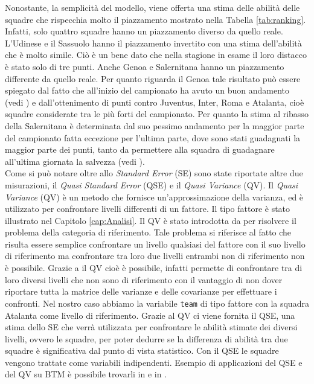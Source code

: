 Nonostante, la semplicità del modello, viene offerta una stima delle abilità delle squadre che rispecchia molto il piazzamento mostrato nella Tabella \ref{tab:ranking}. Infatti, solo quattro squadre hanno un piazzamento diverso da quello reale. L'Udinese e il Sassuolo hanno il piazzamento invertito con una stima dell'abilità che è molto simile. Ciò è un bene dato che nella stagione in esame il loro distacco è stato solo di tre punti. Anche Genoa e Salernitana hanno un piazzamento differente da quello reale. Per quanto riguarda il Genoa tale risultato può essere spiegato dal fatto che all'inizio del campionato ha avuto un buon andamento (vedi \textit{\cite{site:storyGenoa}}) e dall'ottenimento di punti contro Juventus, Inter, Roma e Atalanta, cioè squadre considerate tra le più forti del campionato. Per quanto la stima al ribasso della Salernitana è determinata dal suo pessimo andamento per la maggior parte del campionato fatta eccezione per l'ultima parte, dove sono stati guadagnati la maggior parte dei punti, tanto da permettere alla squadra di guadagnare all'ultima giornata la salvezza (vedi \textit{\cite{site:storySal}}). \\
Come si può notare oltre allo \emph{Standard Error} (SE) sono state riportate altre due misurazioni, il \emph{Quasi Standard Error} (QSE) \autocite{firth2004quasi} e il \emph{Quasi Variance} (QV)\autocite{firth2004quasi}. Il \emph{Quasi Variance} (QV)\autocite{firth2004quasi} è un metodo che fornisce un'approssimazione della varianza, ed è utilizzato per confrontare livelli differenti di un fattore. Il tipo fattore è stato illustrato nel Capitolo \ref{cap:Analisi}. Il QV è stato introdotta da \textcite{firth2004quasi} per risolvere il problema della categoria di riferimento. Tale problema si riferisce al fatto che risulta essere semplice confrontare un livello qualsiasi del fattore con il suo livello di riferimento ma confrontare tra loro due livelli entrambi non di riferimento non è possibile. Grazie a il QV cioè è possibile, infatti permette di confrontare tra di loro diversi livelli che non sono di riferimento con il vantaggio di non dover riportare tutta la matrice delle varianze e delle covarianze per effettuare i confronti. Nel nostro caso abbiamo la variabile \texttt{team} di tipo fattore con la squadra Atalanta come livello di riferimento. Grazie al QV ci viene fornita il QSE, una stima dello SE che verrà utilizzata per confrontare le abilità stimate dei diversi livelli, ovvero le squadre, per poter dedurre se la differenza di abilità tra due squadre è significativa dal punto di vista statistico. Con il QSE le squadre vengono trattate come variabili indipendenti. Esempio di applicazioni del QSE e del QV su BTM è possibile trovarli in \textcite{firth2004quasi} e in \textcite{turner2012bradley}.\\
